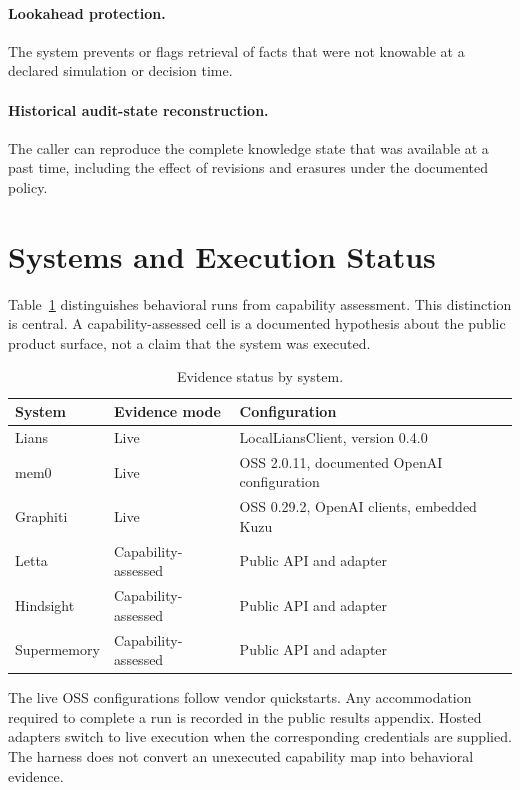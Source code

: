 \documentclass[11pt]{article}
\begin{document}
\paragraph{Lookahead protection.} The system prevents or flags retrieval of facts that were not knowable at a declared simulation or decision time.

\paragraph{Historical audit-state reconstruction.} The caller can reproduce the complete knowledge state that was available at a past time, including the effect of revisions and erasures under the documented policy.

\section{Systems and Execution Status}
Table~\ref{tab:evidence} distinguishes behavioral runs from capability assessment. This distinction is central. A capability-assessed cell is a documented hypothesis about the public product surface, not a claim that the system was executed.

\begin{table}[ht]
\centering
\caption{Evidence status by system.}
\label{tab:evidence}
\begin{tabular}{lll}
\toprule
System & Evidence mode & Configuration \\
\midrule
Lians & Live & LocalLiansClient, version 0.4.0 \\
mem0 & Live & OSS 2.0.11, documented OpenAI configuration \\
Graphiti & Live & OSS 0.29.2, OpenAI clients, embedded Kuzu \\
Letta & Capability-assessed & Public API and adapter \\
Hindsight & Capability-assessed & Public API and adapter \\
Supermemory & Capability-assessed & Public API and adapter \\
\bottomrule
\end{tabular}
\end{table}

The live OSS configurations follow vendor quickstarts. Any accommodation required to complete a run is recorded in the public results appendix. Hosted adapters switch to live execution when the corresponding credentials are supplied. The harness does not convert an unexecuted capability map into behavioral evidence.
\end{document}
